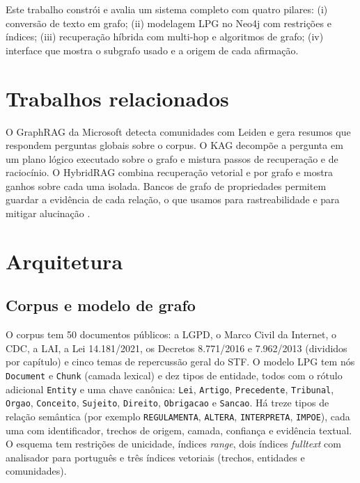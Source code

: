\documentclass[12pt]{article}
\begin{document}
Este trabalho constrói e avalia um sistema completo com quatro pilares: (i) conversão de texto em grafo;
(ii) modelagem LPG no Neo4j com restrições e índices; (iii) recuperação híbrida com multi-hop e algoritmos de
grafo; (iv) interface que mostra o subgrafo usado e a origem de cada afirmação.

\section{Trabalhos relacionados}

O GraphRAG da Microsoft \cite{edge2024graphrag} detecta comunidades com Leiden \cite{traag2019leiden} e gera
resumos que respondem perguntas globais sobre o corpus. O KAG \cite{liang2024kag} decompõe a pergunta em um
plano lógico executado sobre o grafo e mistura passos de recuperação e de raciocínio. O HybridRAG
\cite{sarmah2024hybridrag} combina recuperação vetorial e por grafo e mostra ganhos sobre cada uma isolada.
Bancos de grafo de propriedades \cite{robinson2015graphdb} permitem guardar a evidência de cada relação, o que
usamos para rastreabilidade e para mitigar alucinação \cite{ji2023hallucination}.

\section{Arquitetura}

\subsection{Corpus e modelo de grafo}

O corpus tem 50 documentos públicos: a LGPD, o Marco Civil da Internet, o CDC, a LAI, a Lei 14.181/2021,
os Decretos 8.771/2016 e 7.962/2013 (divididos por capítulo) e cinco temas de repercussão geral do STF. O
modelo LPG tem nós \texttt{Document} e \texttt{Chunk} (camada lexical) e dez tipos de entidade, todos com o
rótulo adicional \texttt{Entity} e uma chave canônica: \texttt{Lei}, \texttt{Artigo}, \texttt{Precedente},
\texttt{Tribunal}, \texttt{Orgao}, \texttt{Conceito}, \texttt{Sujeito}, \texttt{Direito}, \texttt{Obrigacao} e
\texttt{Sancao}. Há treze tipos de relação semântica (por exemplo \texttt{REGULAMENTA}, \texttt{ALTERA},
\texttt{INTERPRETA}, \texttt{IMPOE}), cada uma com identificador, trechos de origem, camada, confiança e
evidência textual. O esquema tem restrições de unicidade, índices \emph{range}, dois índices \emph{fulltext} com
analisador para português e três índices vetoriais (trechos, entidades e comunidades).
\end{document}
